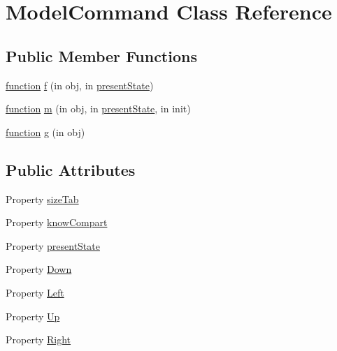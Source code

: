 \hypertarget{class_model_command}{}\section{Model\+Command Class Reference}
\label{class_model_command}
\subsection*{Public Member Functions}
\begin{DoxyCompactItemize}
\item 
\hyperlink{_plan__desuma_functions__2_players_8m_ac2ffb26d6f42d3bbcd7847b0873403f4}{function} \hyperlink{class_model_command_ad9bed4bf30a168ad0154e2a4bc93f580}{f} (in obj, in \hyperlink{class_model_command_a9624cc7c421a50fa5086b0ebd0cd5fe3}{present\+State})
\item 
\hyperlink{_plan__desuma_functions__2_players_8m_ac2ffb26d6f42d3bbcd7847b0873403f4}{function} \hyperlink{class_model_command_accd2878e039165d11e1c6ff627011a8f}{m} (in obj, in \hyperlink{class_model_command_a9624cc7c421a50fa5086b0ebd0cd5fe3}{present\+State}, in init)
\item 
\hyperlink{_plan__desuma_functions__2_players_8m_ac2ffb26d6f42d3bbcd7847b0873403f4}{function} \hyperlink{class_model_command_a07dadfabe92bf9a144b8a862720e7746}{g} (in obj)
\end{DoxyCompactItemize}
\subsection*{Public Attributes}
\begin{DoxyCompactItemize}
\item 
Property \hyperlink{class_model_command_ae640bc88fc010e791bc24036ce976b37}{size\+Tab}
\item 
Property \hyperlink{class_model_command_a59407fbe55b01e6b22ab9dc2897c2f98}{know\+Compart}
\item 
Property \hyperlink{class_model_command_a9624cc7c421a50fa5086b0ebd0cd5fe3}{present\+State}
\item 
Property \hyperlink{class_model_command_a599567ab57008085bdab48d7322d8eaf}{Down}
\item 
Property \hyperlink{class_model_command_a7edf2994669ca05bdad7ce3d4815b498}{Left}
\item 
Property \hyperlink{class_model_command_a49ef9f9d2c8a6ee7c27e9394fd77cf71}{Up}
\item 
Property \hyperlink{class_model_command_a4bdfea9b73cccac7b0ab0055207de078}{Right}
\end{DoxyCompactItemize}


